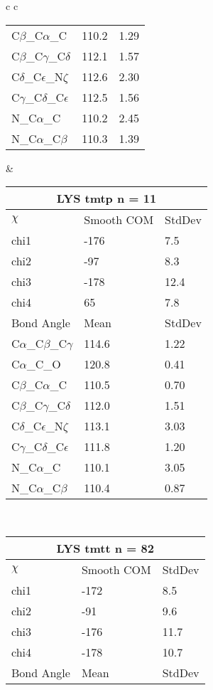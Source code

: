 \begin{longtable}{ c c }
\begin{tabular}{ l l l }
  C$\beta$\_C$\alpha$\_C & 110.2 & 1.29\\
  C$\beta$\_C$\gamma$\_C$\delta$ & 112.1 & 1.57\\
  C$\delta$\_C$\epsilon$\_N$\zeta$ & 112.6 & 2.30\\
  C$\gamma$\_C$\delta$\_C$\epsilon$ & 112.5 & 1.56\\
  N\_C$\alpha$\_C & 110.2 & 2.45\\
  N\_C$\alpha$\_C$\beta$ & 110.3 & 1.39\\
  \bottomrule
  \end{tabular}
  &
  \begin{tabular}{ l l l }
  \toprule
  \multicolumn{3}{c}{LYS \textbf{tmtp} n = 11} \\ \toprule
  $\chi$       & Smooth COM & StdDev \\ \midrule
  chi1 & -176 & 7.5 \\ 
  chi2 & -97 & 8.3 \\ 
  chi3 & -178 & 12.4 \\ 
  chi4 & 65 & 7.8 \\ \midrule
  Bond Angle   & Mean     & StdDev \\ \midrule
  C$\alpha$\_C$\beta$\_C$\gamma$ & 114.6 & 1.22\\
  C$\alpha$\_C\_O & 120.8 & 0.41\\
  C$\beta$\_C$\alpha$\_C & 110.5 & 0.70\\
  C$\beta$\_C$\gamma$\_C$\delta$ & 112.0 & 1.51\\
  C$\delta$\_C$\epsilon$\_N$\zeta$ & 113.1 & 3.03\\
  C$\gamma$\_C$\delta$\_C$\epsilon$ & 111.8 & 1.20\\
  N\_C$\alpha$\_C & 110.1 & 3.05\\
  N\_C$\alpha$\_C$\beta$ & 110.4 & 0.87\\
  \bottomrule
  \end{tabular}
  \\
  \begin{tabular}{ l l l }
  \toprule
  \multicolumn{3}{c}{LYS \textbf{tmtt} n = 82} \\ \toprule
  $\chi$       & Smooth COM & StdDev \\ \midrule
  chi1 & -172 & 8.5 \\ 
  chi2 & -91 & 9.6 \\ 
  chi3 & -176 & 11.7 \\ 
  chi4 & -178 & 10.7 \\ \midrule
  Bond Angle   & Mean     & StdDev \\ \midrule

\end{tabular}
\end{longtable}
